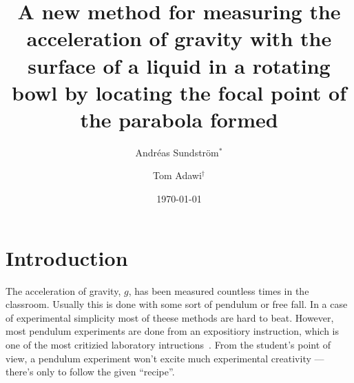 \documentclass[11pt,towcolumn, swedish, english]{article}
\begin{document}
\title{A new method for measuring the acceleration of gravity with the
  surface of a liquid in a rotating bowl by locating the focal point
  of the parabola formed} 

\author{Andréas Sundström$^*$
\and Tom Adawi$^\dagger$
}
\date{\today}




\section{Introduction}
The acceleration of gravity, $g$, has been measured countless times in the
classroom. Usually this is done with some sort of pendulum or free fall. In a
case of experimental simplicity most of theese methods are hard to beat. 
However, most pendulum experiments are done from an expositiory
instruction, which is one of the most critizied laboratory
intructions~\cite{Domin1999}. From the student's point of view, a
pendulum experiment 
won't excite much experimental creativity --- there's only to follow the
given ``recipe''. 
\end{document}
